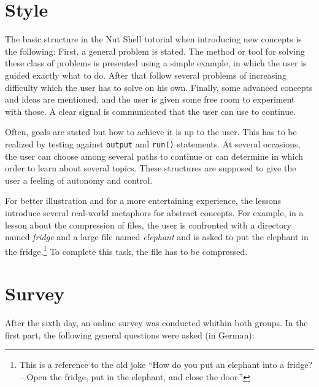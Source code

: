 \documentclass[paper=a4,twoside,abstract=on,cleardoublepage=empty,numbers=noenddot,toc=bib,11pt,appendixprefix=true]{scrreprt}
\begin{document}
\section{Style}

The basic structure in the Nut Shell tutorial when introducing new concepts is the following: First, a general problem is stated. The method or tool for solving these class of problems is presented using a simple example, in which the user is guided exactly what to do. After that follow several problems of increasing difficulty which the user has to solve on his own. Finally, some advanced concepts and ideas are mentioned, and the user is given some free room to experiment with those. A clear signal is communicated that the user can use to continue.

Often, goals are stated but how to achieve it is up to the user. This has to be realized by testing against \texttt{output} and \texttt{run()} statements. At several occasions, the user can choose among several paths to continue or can determine in which order to learn about several topics. These structures are supposed to give the user a feeling of autonomy and control.

For better illustration and for a more entertaining experience, the lessons introduce several real-world metaphors for abstract concepts. For example, in a lesson about the compression of files, the user is confronted with a directory named \textit{fridge} and a large file named \textit{elephant} and is asked to put the elephant in the fridge.\footnote{This is a reference to the old joke “How do you put an elephant into a fridge? -- Open the fridge, put in the elephant, and close the door.”} To complete this task, the file has to be compressed.

\section{Survey}

After the sixth day, an online survey was conducted whithin both groups. In the first part, the following general questions were asked (in German):
\end{document}
